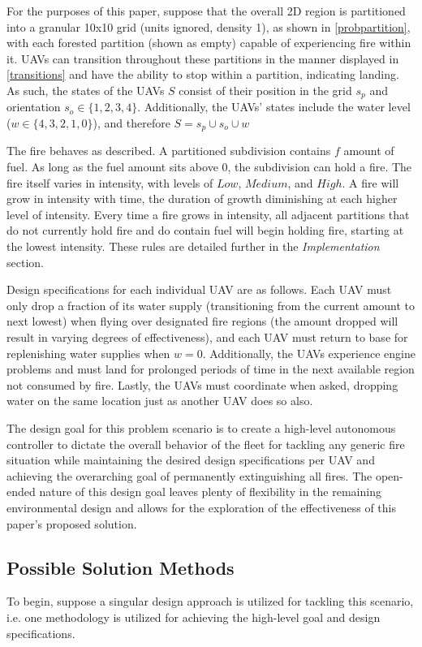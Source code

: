 \documentclass[journal]{IEEEtran}
\begin{document}
For the purposes of this paper, suppose that the overall 2D region is partitioned into a granular 10x10 grid (units ignored, density 1), as shown in \ref{probpartition}, with each forested partition (shown as empty) capable of experiencing fire within it. UAVs can transition throughout these partitions in the manner displayed in \ref{transitions} and have the ability to stop within a partition, indicating landing. As such, the states of the UAVs $S$ consist of their position in the grid $s_{p}$ and orientation $s_o \in \{1,2,3,4\}$. Additionally, the UAVs’ states include the water level ($w \in \{4,3,2,1,0\}$), and therefore $S = s_p \cup s_o \cup w$

The fire behaves as described. A partitioned subdivision contains $f$ amount of fuel. As long as the fuel amount sits above $0$, the subdivision can hold a fire. The fire itself varies in intensity, with levels of $Low$, $Medium$, and $High$. A fire will grow in intensity with time, the duration of growth diminishing at each higher level of intensity. Every time a fire grows in intensity, all adjacent partitions that do not currently hold fire and do contain fuel will begin holding fire, starting at the lowest intensity. These rules are detailed further in the \textit{Implementation} section.

Design specifications for each individual UAV are as follows. Each UAV must only drop a fraction of its water supply (transitioning from the current amount to next lowest) when flying over designated fire regions (the amount dropped will result in varying degrees of effectiveness), and each UAV must return to base for replenishing water supplies when $w = 0$. Additionally, the UAVs experience engine problems and must land for prolonged periods of time in the next available region not consumed by fire. Lastly, the UAVs must coordinate when asked, dropping water on the same location just as another UAV does so also. 

The design goal for this problem scenario is to create a high-level autonomous controller to dictate the overall behavior of the fleet for tackling any generic fire situation while maintaining the desired design specifications per UAV and achieving the overarching goal of permanently extinguishing all fires. The open-ended nature of this design goal leaves plenty of flexibility in the remaining environmental design and allows for the exploration of the effectiveness of this paper’s proposed solution.

\subsection{Possible Solution Methods}
To begin, suppose a singular design approach is utilized for tackling this scenario, i.e. one methodology is utilized for achieving the high-level goal and design specifications.
\end{document}
